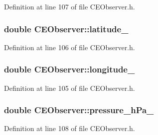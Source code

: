 Definition at line 107 of file C\+E\+Observer.\+h.

\hypertarget{class_c_e_observer_a30235a99b3b715fb1e4381d4a1f5837d}{}
\subsubsection[{latitude\+\_\+}]{\setlength{\rightskip}{0pt plus 5cm}double C\+E\+Observer\+::latitude\+\_\+\hspace{0.3cm}{\ttfamily [protected]}}\label{class_c_e_observer_a30235a99b3b715fb1e4381d4a1f5837d}


Definition at line 106 of file C\+E\+Observer.\+h.

\hypertarget{class_c_e_observer_ac76c0ef9070cf96db45b5196b481dadc}{}
\subsubsection[{longitude\+\_\+}]{\setlength{\rightskip}{0pt plus 5cm}double C\+E\+Observer\+::longitude\+\_\+\hspace{0.3cm}{\ttfamily [protected]}}\label{class_c_e_observer_ac76c0ef9070cf96db45b5196b481dadc}


Definition at line 105 of file C\+E\+Observer.\+h.

\hypertarget{class_c_e_observer_a566c7f1ab1e66968981b52d4bd694474}{}
\subsubsection[{pressure\+\_\+h\+Pa\+\_\+}]{\setlength{\rightskip}{0pt plus 5cm}double C\+E\+Observer\+::pressure\+\_\+h\+Pa\+\_\+\hspace{0.3cm}{\ttfamily [protected]}}\label{class_c_e_observer_a566c7f1ab1e66968981b52d4bd694474}


Definition at line 108 of file C\+E\+Observer.\+h.

\hypertarget{class_c_e_observer_a1517a290b142b72e5f82a5a42bc9f565}{}
